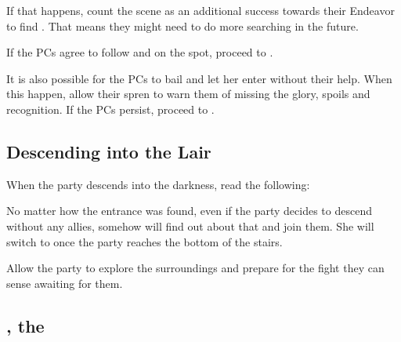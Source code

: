 If that happens, count the scene as an additional success towards their Endeavor to find \npcMidnightMother{}. That means they might need to do more searching in the future.

If the PCs agree to follow \npcShallan{} and \npcAdolin{} on the spot, proceed to .

It is also possible for the PCs to bail \npcShallan{} and let her enter without their help. When this happen, allow their spren to warn them of missing the glory, spoils and recognition. If the PCs persist, proceed to .




\newpage
\subsection{Descending into the Lair}
\label{ssec:middnightMotherEnter}

When the party descends into the darkness, read the following:


No matter how the entrance was found, even if the party decides to descend without any allies, somehow \npcVeil{} will find out about that and join them. She will switch to \npcShallan{} once the party reaches the bottom of the stairs.

Allow the party to explore the surroundings and prepare for the fight they can sense awaiting for them.


\subsection{\npcMidnightMotherName{}, the \npcMidnightMotherTitle{}}
\label{ssec:middnightMotherFight}

